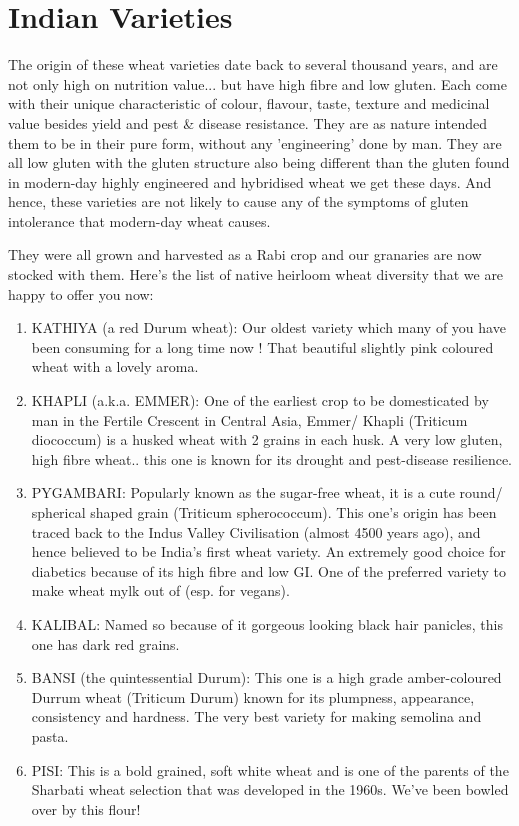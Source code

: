 \documentclass[12]{article}
\begin{document}
\section{Indian Varieties}

The origin of these wheat varieties date back to several thousand years, and are not only high on nutrition value... but have high fibre and low gluten. Each come with their unique characteristic of colour, flavour, taste, texture and medicinal value besides yield and pest \& disease resistance.
They are as nature intended them to be in their pure form, without any 'engineering' done by man. They are all low gluten with the gluten structure also being different than the gluten found in modern-day highly engineered and hybridised wheat we get these days. And hence, these varieties are not likely to cause any of the symptoms of gluten intolerance that modern-day wheat causes.

They were all grown and harvested as a Rabi crop and our granaries are now stocked with them. Here's the list of native heirloom wheat diversity that we are happy to offer you now:

\begin{enumerate}

\item KATHIYA (a red Durum wheat): Our oldest variety which many of you have been consuming for a long time now ! That beautiful slightly pink coloured wheat with a lovely aroma.

\item KHAPLI (a.k.a. EMMER): One of the earliest crop to be domesticated by man in the Fertile Crescent in Central Asia, Emmer/ Khapli (Triticum diococcum) is a husked wheat with 2 grains in each husk. A very low gluten, high fibre wheat.. this one is known for its drought and pest-disease resilience.

\item PYGAMBARI: Popularly known as the sugar-free wheat, it is a cute round/ spherical shaped grain (Triticum spherococcum). This one's origin has been traced back to the Indus Valley Civilisation (almost 4500 years ago), and hence believed to be India's first wheat variety. An extremely good choice for diabetics because of its high fibre and low GI. One of the preferred variety to make wheat mylk out of (esp. for vegans).

\item KALIBAL: Named so because of it gorgeous looking black hair panicles, this one has dark red grains.

\item BANSI (the quintessential Durum): This one is a high grade amber-coloured Durrum wheat (Triticum Durum) known for its plumpness, appearance, consistency and hardness. The very best variety for making semolina and pasta.

\item PISI: This is a bold grained, soft white wheat and is one of the parents of the Sharbati wheat selection that was developed in the 1960s. We've been bowled over by this flour!

\end{enumerate}
\end{document}
